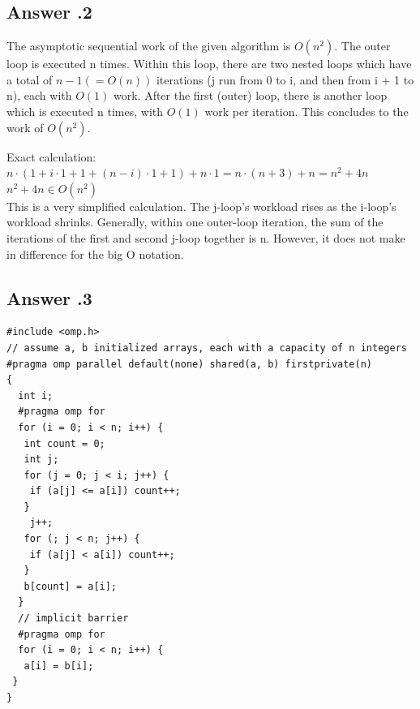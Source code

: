 \documentclass[a4paper,%
11pt,%
DIV=12,
headsepline,%
headings=normal,
]{scrartcl}
\newcounter{curex}
\newcommand{\answer}[1]{\subsection*{Answer \arabic{curex}.#1}}
\begin{document}
\answer{2}
The asymptotic sequential work of the given algorithm is $O(n^{2})$. The outer loop is executed n times. Within this loop, there are two nested loops which have a total of $n-1 (= O(n))$ iterations (j run from 0 to i, and then from i + 1 to n), each with $O(1)$ work. After the first (outer) loop, there is another loop which is executed n times, with $O(1)$ work per iteration. This concludes to the work of $O(n^{2})$. 


\noindent
Exact calculation:
$ n \cdot (1 + i \cdot 1 + 1 + (n-i) \cdot 1 + 1) + n \cdot 1 = n \cdot (n + 3) + n = n^2 + 4n $\\
$n^2 + 4n \in O(n^2)$ \\
This is a very simplified calculation. The j-loop's workload rises as the i-loop's workload shrinks. Generally, within one outer-loop iteration, the sum of the iterations of the first and second j-loop together is n. However, it does not make in difference for the big O notation.

\answer{3}
\begin{minipage}[t]{1.0\linewidth}
\begin{lstlisting}
#include <omp.h>
// assume a, b initialized arrays, each with a capacity of n integers
#pragma omp parallel default(none) shared(a, b) firstprivate(n)
{
  int i;
  #pragma omp for
  for (i = 0; i < n; i++) {
   int count = 0;
   int j;
   for (j = 0; j < i; j++) {
    if (a[j] <= a[i]) count++;
   }
    j++;
   for (; j < n; j++) {
    if (a[j] < a[i]) count++;
   }
   b[count] = a[i];
  }
  // implicit barrier
  #pragma omp for
  for (i = 0; i < n; i++) {
   a[i] = b[i];
 }
}
\end{lstlisting}
\end{minipage}
\end{document}
